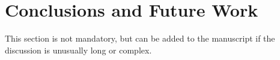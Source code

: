 \section{Conclusions and Future Work}

This section is not mandatory, but can be added to the manuscript if the discussion is unusually long or complex.